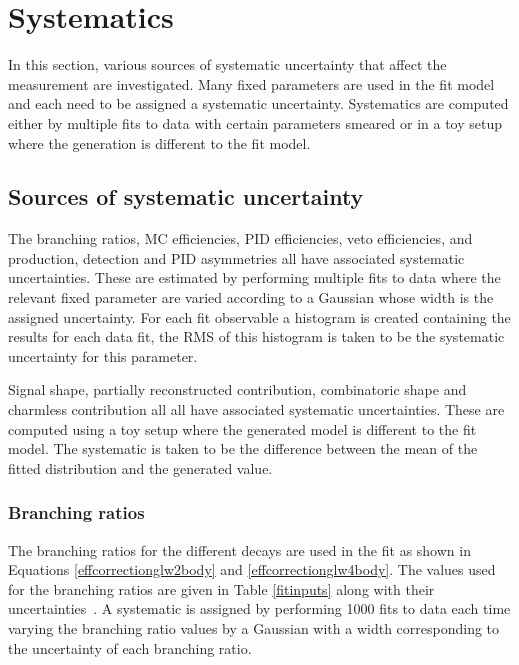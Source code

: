 
\clearpage

\section{Systematics}
\label{sec:systematics}

In this section, various sources of systematic uncertainty that affect the measurement are investigated. Many fixed parameters are used in the fit model and each need to be assigned a systematic uncertainty. Systematics are computed either by multiple fits to data with certain parameters smeared or in a toy setup where the generation is different to the fit model. 

\subsection{Sources of systematic uncertainty}

The branching ratios, MC efficiencies, PID efficiencies, veto efficiencies, and production, detection and PID asymmetries all have associated systematic uncertainties. These are estimated by performing multiple fits to data where the relevant fixed parameter are varied according to a Gaussian whose width is the assigned uncertainty. For each fit observable a histogram is created containing the results for each data fit, the RMS of this histogram is taken to be the systematic uncertainty for this parameter.

Signal shape, partially reconstructed contribution, combinatoric shape and charmless contribution all all have associated systematic uncertainties. These are computed using a toy setup where the generated model is different to the fit model. The systematic is taken to be the difference between the mean of the fitted distribution and the generated value.

\subsubsection{Branching ratios}

The branching ratios for the different \D decays are used in the \CP fit as shown in Equations \ref{effcorrectionglw2body} and \ref{effcorrectionglw4body}. The values used for the branching ratios are given in Table \ref{fitinputs} along with their uncertainties~\cite{PDG2014}. A systematic is assigned by performing 1000 fits to data each time varying the branching ratio values by a Gaussian with a width corresponding to the uncertainty of each branching ratio.


